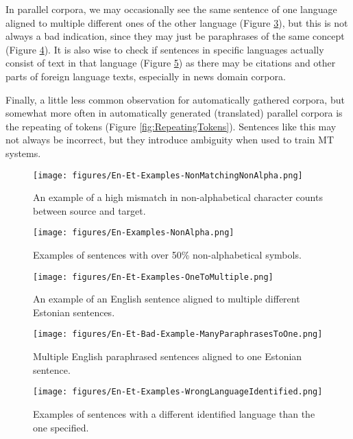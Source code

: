 \documentclass{IOS-Book-Article}
\begin{document}
In parallel corpora, we may occasionally see the same sentence of one language aligned to multiple different ones of the other language (Figure \ref{fig:OneToMultiple}), but this is not always a bad indication, since they may just be paraphrases of the same concept (Figure \ref{fig:ManyParaphrasesToOne}). It is also wise to check if sentences in specific languages actually consist of text in that language (Figure \ref{fig:WrongLanguageIdentified}) as there may be citations and other parts of foreign language texts, especially in news domain corpora.

Finally, a little less common observation for automatically gathered corpora, but somewhat more often in automatically generated (translated) parallel corpora is the repeating of tokens (Figure \ref{fig:RepeatingTokens}). Sentences like this may not always be incorrect, but they introduce ambiguity when used to train MT systems.

\begin{figure}[ht]
    \texttt{[image: figures/En-Et-Examples-NonMatchingNonAlpha.png]}
    \caption{An example of a high mismatch in non-alphabetical character counts between source and target.}
    \label{fig:NonMatchingNonAlpha}
\end{figure}

\begin{figure}[ht]
  \texttt{[image: figures/En-Examples-NonAlpha.png]}
  \caption{Examples of sentences with over 50\% non-alphabetical symbols.}
  \label{fig:NonAlpha}
\end{figure}

\begin{figure}[ht]
	\centering
  	\texttt{[image: figures/En-Et-Examples-OneToMultiple.png]}
    \caption{An example of an English sentence aligned to multiple different Estonian sentences.}
    \label{fig:OneToMultiple}
\end{figure}

\begin{figure}[ht]
	\centering
    \texttt{[image: figures/En-Et-Bad-Example-ManyParaphrasesToOne.png]}
    \caption{Multiple English paraphrased sentences aligned to one Estonian sentence.}
    \label{fig:ManyParaphrasesToOne}
\end{figure}

\begin{figure}[ht]
  \texttt{[image: figures/En-Et-Examples-WrongLanguageIdentified.png]}
  \caption{Examples of sentences with a different identified language than the one specified.}
  \label{fig:WrongLanguageIdentified}
\end{figure}
\end{document}

